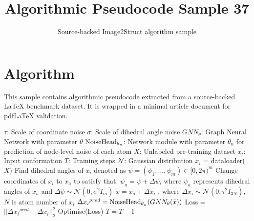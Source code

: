 \documentclass[11pt]{article}
\title{Algorithmic Pseudocode Sample 37}
\author{Source-backed Image2Struct algorithm sample}
\date{}
\begin{document}
\maketitle
\section{Algorithm}
This sample contains algorithmic pseudocode extracted from a source-backed LaTeX benchmark dataset. It is wrapped in a minimal article document for pdfLaTeX validation.

\begin{algorithm}[htbp]
\caption{Source-backed algorithmic procedure}
\begin{algorithm}
[htbp]
\caption{Applying Frad to pre-training}\begin{algorithmic}[1]
\Require
\Statex$\tau$: Scale of coordinate noise
\Statex$\sigma$: Scale of dihedral angle noise
\Statex$GNN_{\theta}$: Graph Neural Network with parameter $\theta$
\Statex ${\rm NoiseHead}_{\theta_{n}}$: Network module with parameter $\theta_{n}$ for prediction of node-level noise of each atom
\Statex$X$: Unlabeled pre-training dataset
\Statex$x_i$: Input conformation
\Statex$T$: Training steps
\Statex$\mathcal N$: Gaussian distribution
\State $x_i$ = dataloader($X$) 
\State Find dihedral angles of $x_i$ denoted as $\psi=(\psi_1,..., \psi_m)\in [0,2\pi)^m$
\State Change coordinates of $x_i$ to $x_a$ to satisfy that: $\psi_{a}=\psi+\Delta\psi$, where $\psi_{a}$ represents dihedral angles of $x_a$ and $\Delta\psi \sim \mathcal{N}(0, {\sigma}^2I_{m})$
\State $\tilde{x} = x_{a} + \Delta{x_i}$ , where $\Delta{x_i} \sim \mathcal{N}(0, {\tau}^2I_{3N})$, $N$ is atom number of $x_i$
\State$\Delta{x_i}^{pred} = {\rm NoiseHead}_{\theta_{n}}(GNN_{\theta}(\tilde{x}))$
\State Loss = $||\Delta{x_i}^{pred} - \Delta{x_i}||_{2}^{2}$
\State Optimise(Loss)
\State $T = T - 1$
\EndWhile
\end{algorithmic}
\end{algorithm}
\end{algorithm}
\end{document}

